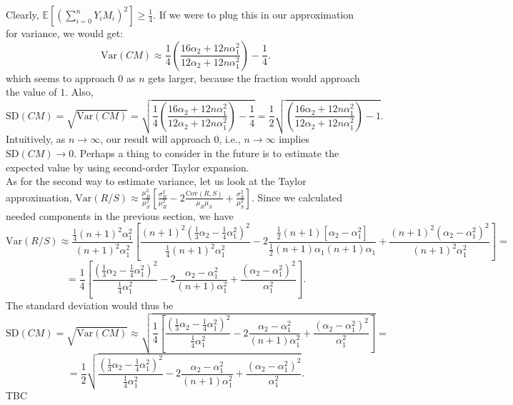 \documentclass[11pt, twoside, reqno]{book}
\newcommand{\sd}{\text{SD}}
\newcommand{\Var}{\text{Var}}
\newcommand{\Cov}{\text{Cov}}
\begin{document}
Clearly, $\mathbb{E}\left[\left(\sum^{n}_{i=0}Y_{i}M_{i}\right)^{2}\right] \geq \frac{1}{4}$. If we were to plug this in our approximation for variance, we would get:
$$\Var(CM) \approx \frac{1}{4}\left(\frac{16\alpha_{2}+12n\alpha_{1}^{2}}{12\alpha_{2}+12n\alpha^{2}_{1}} \right) - \frac{1}{4}.$$
which seems to approach $0$ as $n$ gets larger, because the fraction would approach the value of $1$. Also,
$$\sd(CM) = \sqrt{\Var(CM)} = \sqrt{\frac{1}{4}\left(\frac{16\alpha_{2}+12n\alpha_{1}^{2}}{12\alpha_{2}+12n\alpha^{2}_{1}} \right) - \frac{1}{4}} = \frac{1}{2}\sqrt{\left(\frac{16\alpha_{2}+12n\alpha_{1}^{2}}{12\alpha_{2}+12n\alpha^{2}_{1}} \right) - 1}.$$
Intuitively, as $n\to \infty$, our result will approach $0$, i.e., $n \to\infty$ implies $\sd(CM)\to 0$. Perhaps a thing to consider in the future is to estimate the expected value by using second-order Taylor expansion. \\
As for the second way to estimate variance, let us look at the Taylor approximation, $\Var(R/S) \approx \frac{\mu_{R}^{2}}{\mu_{S}^{2}}\left[ \frac{\sigma_{R}^{2}}{\mu_{R}^{2}} - 2 \frac{\Cov(R, S)}{\mu_{R}\mu_{S}}+ \frac{\sigma^{2}_{S}}{\mu_{S}^{2}}\right]$. Since we calculated needed components in the previous section, we have
$$\Var(R/S) \approx \frac{\frac{1}{4}(n+1)^{2}\alpha_{1}^{2}}{(n+1)^{2}\alpha_{1}^{2}}\left[ \frac{(n+1)^{2}\left(\frac{1}{3} \alpha_{2}-\frac{1}{4}\alpha_{1}^{2}\right)^{2}}{\frac{1}{4}(n+1)^{2}\alpha_{1}^{2}} - 2 \frac{\frac{1}{2}(n+1)[\alpha_{2}-\alpha_{1}^{2}]}{\frac{1}{2}(n+1)\alpha_{1}(n+1)\alpha_{1}}+ \frac{(n+1)^{2}(\alpha_{2}-\alpha_{1}^{2})^{2}}{(n+1)^{2}\alpha_{1}^{2}}\right]=$$
$$= \frac{1}{4}\left[ \frac{\left(\frac{1}{3} \alpha_{2}-\frac{1}{4}\alpha_{1}^{2}\right)^{2}}{\frac{1}{4}\alpha_{1}^{2}} - 2 \frac{\alpha_{2}-\alpha_{1}^{2}}{(n+1)\alpha_{1}^{2}} + \frac{(\alpha_{2}-\alpha_{1}^{2})^{2}}{\alpha_{1}^{2}}\right].$$
The standard deviation would thus be
$$\sd(CM) = \sqrt{\Var(CM)} \approx \sqrt{\frac{1}{4}\left[ \frac{\left(\frac{1}{3} \alpha_{2}-\frac{1}{4}\alpha_{1}^{2}\right)^{2}}{\frac{1}{4}\alpha_{1}^{2}} - 2 \frac{\alpha_{2}-\alpha_{1}^{2}}{(n+1)\alpha_{1}^{2}} + \frac{(\alpha_{2}-\alpha_{1}^{2})^{2}}{\alpha_{1}^{2}}\right]}=$$
$$=\frac{1}{2}\sqrt{ \frac{\left(\frac{1}{3} \alpha_{2}-\frac{1}{4}\alpha_{1}^{2}\right)^{2}}{\frac{1}{4}\alpha_{1}^{2}} - 2 \frac{\alpha_{2}-\alpha_{1}^{2}}{(n+1)\alpha_{1}^{2}} + \frac{(\alpha_{2}-\alpha_{1}^{2})^{2}}{\alpha_{1}^{2}}}.$$
TBC
\end{document}
